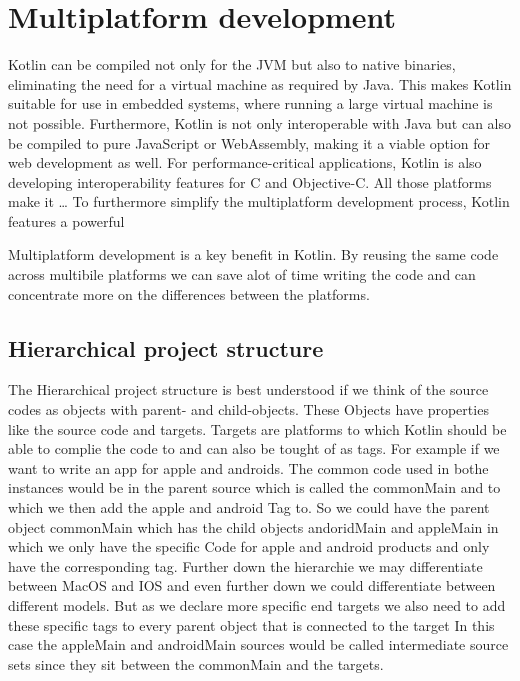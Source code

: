 \documentclass[a4paper,11pt]{article}
\begin{document}
\section{Multiplatform development}
Kotlin can be compiled not only for the JVM but also to native binaries, eliminating the need for a virtual machine as required by Java. This makes Kotlin suitable for use in embedded systems, where running a large virtual machine is not possible. Furthermore, Kotlin is not only interoperable with Java but can also be compiled to pure JavaScript or WebAssembly, making it a viable option for web development as well. For performance-critical applications, Kotlin is also developing interoperability features for C and Objective-C.
All those platforms make it \ldots 
To furthermore simplify the multiplatform development process, Kotlin features a powerful 




Multiplatform development is a key benefit in Kotlin. By reusing the same code across multibile platforms we can save alot of time writing the code and can concentrate more on the differences between the platforms.

\subsection{Hierarchical project structure}
The Hierarchical project structure is best understood if we think of the source codes as objects with parent- and child-objects. These Objects have properties like the source code and targets. Targets are platforms to which Kotlin should be able to complie the code to and can also be tought of as tags. For example if we want to write an app for apple and androids. The common code used in bothe instances would be in the parent source which is called the commonMain and to which we then add the apple and android Tag to.  So we could have the parent object commonMain which has the child objects andoridMain and appleMain in which we only have the specific Code for apple and android products and only have the corresponding tag. Further down the hierarchie we may differentiate between MacOS and IOS and even further down we could differentiate between different models. But as we declare more specific end targets we also need to add these specific tags to every parent object that is connected to the target
In this case the appleMain and androidMain sources would be called intermediate source sets since they sit between the commonMain and the targets.
\end{document}
